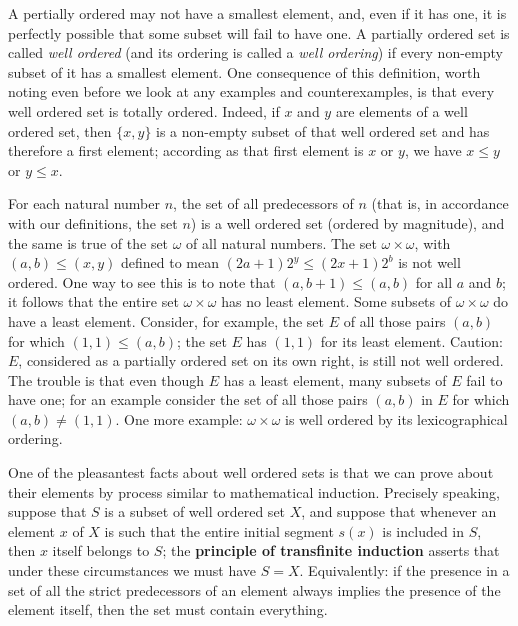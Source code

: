 
A pertially ordered may not have a smallest element, and, even if it has one, it is perfectly possible that some subset will fail to have one. A partially ordered set is called \textit{well ordered} (and its ordering is called a \textit{well ordering}) if every non-empty subset of it has a smallest element. One consequence of this definition, worth noting even before we look at any examples and counterexamples, is that every well ordered set is totally ordered. Indeed, if $x$ and $y$ are elements of a well ordered set, then $\{ x,y \}$ is a non-empty subset of that well ordered set and has therefore a first element; according as that first element is $x$ or $y$, we have $x \le y$ or $y \le x$.

For each natural number $n$, the set of all predecessors of $n$ (that is, in accordance with our definitions, the set $n$) is a well ordered set (ordered by magnitude), and the same is true of the set $\omega$ of all natural numbers. The set $\omega \times \omega $, with $(a,b) \le (x,y)$ defined to mean $(2a + 1)2^{y} \le (2x + 1)2^{b}$ is not well ordered. One way to see this is to note that $(a,b + 1) \le (a,b)$ for all $a$ and $b$; it follows that the entire set $\omega \times \omega$ has no least element. Some subsets of $\omega \times \omega$ do have a least element. Consider, for example, the set $E$ of all those pairs $(a, b)$ for which $(1,1) \le (a,b)$; the set $E$ has $(1, 1)$ for its least element. Caution: $E$, considered as a partially ordered set on its own right, is still not well ordered. The trouble is that even though $E$ has a least element, many subsets of $E$ fail to have one; for an example consider the set of all those pairs $(a,b)$ in $E$ for which $(a,b) \neq (1, 1)$. One more example: $\omega \times \omega$ is well ordered by its lexicographical ordering. 

One of the pleasantest facts about well ordered sets is that we can prove about their elements by process similar to mathematical induction. Precisely speaking, suppose that $S$ is a subset of well ordered set $X$, and suppose that whenever an element $x$ of $X$ is such that the entire initial segment $s(x)$ is included in $S$, then $x$ itself belongs to $S$; the \textbf{principle of transfinite induction} asserts that under these circumstances we must have $S = X$. Equivalently: if the presence in a set of all the strict predecessors of an element always implies the presence of the element itself, then the set must contain everything. 

